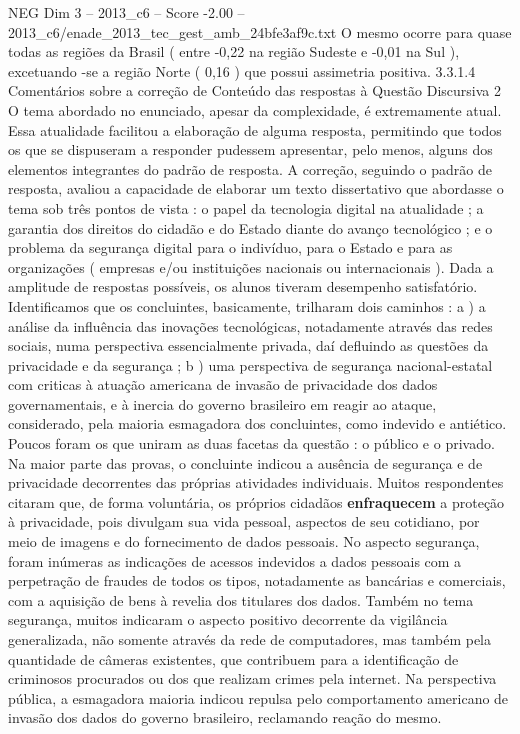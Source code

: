 \begin{textsample}{NEG Dim 3 – 2013\_c6 – Score -2.00 – 2013\_c6/enade\_2013\_tec\_gest\_amb\_24bfe3af9c.txt}
O mesmo ocorre para quase todas as regiões da Brasil ( entre -0,22 na região Sudeste e -0,01 na Sul ), excetuando -se a região Norte ( 0,16 ) que possui assimetria positiva. 3.3.1.4 Comentários sobre a correção de Conteúdo das respostas à Questão Discursiva 2 O tema abordado no enunciado, apesar da complexidade, é extremamente atual.
Essa atualidade facilitou a elaboração de alguma resposta, permitindo que todos os que se dispuseram a responder pudessem apresentar, pelo menos, alguns dos elementos integrantes do padrão de resposta.
A correção, seguindo o padrão de resposta, avaliou a capacidade de elaborar um texto dissertativo que abordasse o tema sob três pontos de vista : o papel da tecnologia digital na atualidade ; a garantia dos direitos do cidadão e do Estado diante do avanço tecnológico ; e o problema da segurança digital para o indivíduo, para o Estado e para as organizações ( empresas e/ou instituições nacionais ou internacionais ).
Dada a amplitude de respostas possíveis, os alunos tiveram desempenho satisfatório.
Identificamos que os concluintes, basicamente, trilharam dois caminhos : a ) a análise da influência das inovações tecnológicas, notadamente através das redes sociais, numa perspectiva essencialmente privada, daí defluindo as questões da privacidade e da segurança ; b ) uma perspectiva de segurança nacional-estatal com criticas à atuação americana de invasão de privacidade dos dados governamentais, e à inercia do governo brasileiro em reagir ao ataque, considerado, pela maioria esmagadora dos concluintes, como indevido e antiético.
Poucos foram os que uniram as duas facetas da questão : o público e o privado.
Na maior parte das provas, o concluinte indicou a ausência de segurança e de privacidade decorrentes das próprias atividades individuais.
Muitos respondentes citaram que, de forma voluntária, os próprios cidadãos \textbf{enfraquecem} a proteção à privacidade, pois divulgam sua vida pessoal, aspectos de seu cotidiano, por meio de imagens e do fornecimento de dados pessoais.
No aspecto segurança, foram inúmeras as indicações de acessos indevidos a dados pessoais com a perpetração de fraudes de todos os tipos, notadamente as bancárias e comerciais, com a aquisição de bens à revelia dos titulares dos dados.
Também no tema segurança, muitos indicaram o aspecto positivo decorrente da vigilância generalizada, não somente através da rede de computadores, mas também pela quantidade de câmeras existentes, que contribuem para a identificação de criminosos procurados ou dos que realizam crimes pela internet.
Na perspectiva pública, a esmagadora maioria indicou repulsa pelo comportamento americano de invasão dos dados do governo brasileiro, reclamando reação do mesmo.

\end{textsample}
